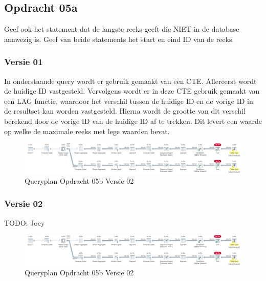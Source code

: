 \subsection{Opdracht 05a}
Geef ook het statement dat de langste reeks geeft die NIET in de database aanwezig is. Geef van beide statements het start en eind ID van de reeks.

\subsubsection{Versie 01}
In onderstaande query wordt er gebruik gemaakt van een CTE. Allereerst wordt de huidige ID vastgesteld. Vervolgens wordt er in deze
CTE gebruik gemaakt van een LAG functie, waardoor het verschil tussen de huidige ID en de vorige ID in de resultset kan worden vastgesteld.
Hierna wordt de grootte van dit verschil berekend door de vorige ID van de huidige ID af te trekken. Dit levert een waarde op welke
de maximale reeks met lege waarden bevat.

\begin{figure}
    \centering
    \includegraphics[width=1\textwidth]{image/marc/opdracht-05b.PNG}
    \caption{Queryplan Opdracht 05b Versie 02}
\end{figure}

\subsubsection{Versie 02}
TODO: Joey

\begin{figure}
    \centering
    \includegraphics[width=1\textwidth]{image/marc/opdracht-05b.PNG}
    \caption{Queryplan Opdracht 05b Versie 02}
\end{figure}

